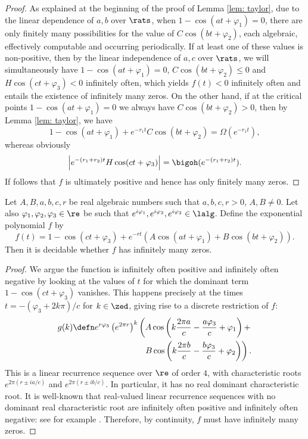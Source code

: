 \begin{proof}
As explained at the beginning of the proof of Lemma \ref{lem: taylor}, due to the linear
dependence of $a, b$ over $\rats$, when $1-\cos(at+\varphi_1)=0$, there are only finitely
many possibilities for the value of $C\cos(bt+\varphi_2)$, each algebraic, effectively
computable and occurring periodically. If at least one of these values is non-positive,
then by the linear independence of $a,c$ over $\rats$, we will simultaneously have 
$1-\cos(at+\varphi_1) = 0$, $C\cos(bt+\varphi_2)\leq 0$ and $H\cos(ct+\varphi_3) < 0$
infinitely often, which yields $f(t)<0$ infinitely often and entails the existence of
infinitely many zeros. On the other hand, if at the critical points $1-\cos(at+\varphi_1) = 0$
we always have $C\cos(bt+\varphi_2) > 0$, then by Lemma \ref{lem: taylor}, we have 
\[ 1-\cos(at+\varphi_1) + e^{-r_1t}C\cos(bt+\varphi_2) = \Omega(e^{-r_1t}), \]
whereas obviously 
\[ \left|e^{-(r_1+r_2)t}H\cos(ct+\varphi_3)\right| = \bigoh(e^{-(r_1+r_2)t}). \]
If follows that $f$ is ultimately positive and hence has only finitely many zeros.
\end{proof}


\begin{lemma}\label{lem: oneOscTwo}
Let $A, B, a, b, c, r$ be real algebraic numbers such that 
$a, b, c, r > 0$,  $A, B \neq 0$.
Let also $\varphi_1,\varphi_2,\varphi_3\in\re$ be
such that
$e^{i\varphi_1},e^{i\varphi_2},e^{i\varphi_3}\in\lalg$.  
Define the exponential polynomial $f$ by
\[
f(t) = 1-\cos(ct + \varphi_3) + e^{-rt}(A\cos(at+\varphi_1) + B\cos(bt+\varphi_2)).
\]
Then it is decidable whether $f$ has infinitely many
zeros. 
\end{lemma}
\begin{proof}
We argue the function is infinitely often positive and infinitely often negative
by looking at the values of $t$ for which the dominant term $1-\cos(ct+\varphi_3)$
vanishes. This happens precisely at the times $t = -(\varphi_3+2k\pi)/c$ for $k\in\zed$,
giving rise to a discrete restriction of $f$:
\begin{align*}
g(k) \defn e^{r\varphi_3}\left(e^{2\pi r}\right)^k
\left(
A\cos\left( k\frac{2\pi a}{c} - \frac{a\varphi_3}{c}+\varphi_1 \right) +\right.\\
\left.
B\cos\left( k\frac{2\pi b}{c} - \frac{b\varphi_3}{c}+\varphi_2 \right)
\right).
\end{align*}
This is a linear recurrence sequence over $\re$ of order $4$, 
with characteristic roots $e^{2\pi(r\pm ia/c)}$ and $e^{2\pi(r\pm ib/c)}$. 
In particular, it has no real dominant characteristic root. It is well-known 
that real-valued  linear recurrence sequences with no dominant real 
characteristic root are infinitely often positive and infinitely often negative:
see for example \cite[Theorem 7.1.1]{gyori}. Therefore, by continuity, 
$f$ must have infinitely many zeros.
\end{proof}


